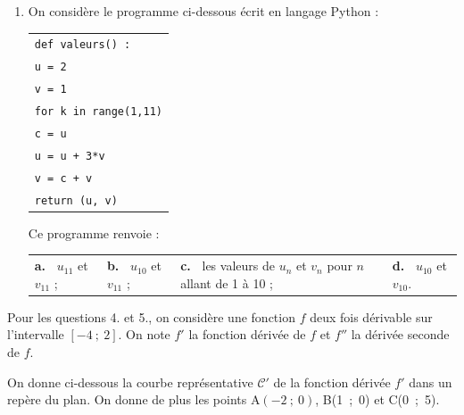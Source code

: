 \documentclass[10pt]{article}
\begin{document}
\begin{enumerate}
\item On considère le programme ci-dessous écrit en langage Python :

\begin{center}
\begin{tabular}{|>{\texttt}l|}\hline
\texttt{def valeurs() :}\\
\quad \texttt{u = 2}\\
\quad \texttt{v = 1}\\
\quad \texttt{for k in range(1,11)}\\
\quad \quad \texttt{c = u}\\
\quad \quad \texttt{u = u + 3*v}\\
\quad \quad \texttt{v = c + v}\\
\quad \texttt{return (u, v)}\\ \hline
\end{tabular}
\end{center}

Ce programme renvoie :

\begin{center}
\begin{tabularx}{\linewidth}{*{4}{X}}
\textbf{a.~} $u_{11}$ et $v_{11}$ ;&
\textbf{b.~} $u_{10}$ et $v_{11}$ ;&
\textbf{c.~} les valeurs de $u_n$ et $v_n$ pour $n$ allant de 1 à 10 ;&
\textbf{d.~} $u_{10}$ et $v_{10}$.
\end{tabularx}
\end{center}
\end{enumerate}

Pour les questions 4. et 5., on considère une fonction $f$ deux fois dérivable sur l'intervalle $[-4~;~2]$. On note $f'$ la fonction dérivée de $f$ et $f''$ la dérivée seconde de $f$.

On donne ci-dessous la courbe représentative $\mathcal{C}'$ de la fonction dérivée $f'$ dans un repère du plan. On donne de plus les points A$(-2~;~0)$, B(1~;~0) et C(0~;~5).
\end{document}

